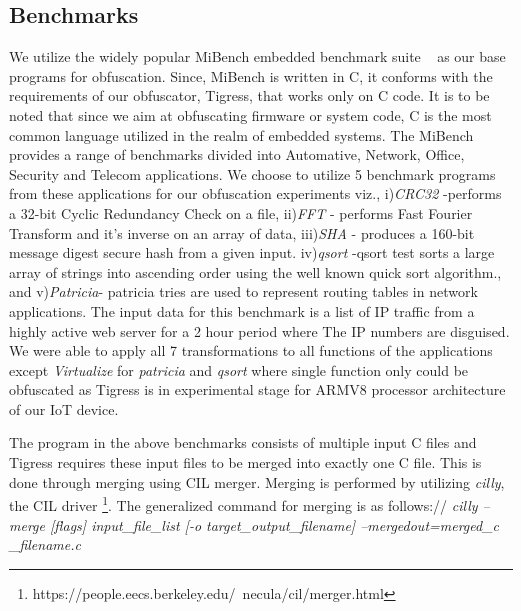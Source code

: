 \subsection{Benchmarks}

We utilize the widely popular MiBench embedded benchmark suite ~\cite{guthaus2001mibench} as our base programs for obfuscation. Since, MiBench is written in C, it conforms with the requirements of our obfuscator, Tigress, that works only on C code. It is to be noted that since we aim at obfuscating firmware or system code, C is the most common language utilized in the realm of embedded systems. The MiBench provides a range of benchmarks divided into Automative, Network, Office, Security and Telecom applications. We choose to utilize 5 benchmark programs from these applications for our obfuscation experiments viz., i)\textit{CRC32} -performs a 32-bit Cyclic Redundancy Check on a file, ii)\textit{FFT} - performs Fast Fourier Transform and it's inverse on an array of data, iii)\textit{SHA} - produces a 160-bit message digest secure hash from a given input. iv)\textit{qsort} -qsort test sorts a large array of strings into ascending order using the well known quick sort algorithm., and v)\textit{Patricia}- patricia tries are used to represent routing tables in network applications. The input data for this benchmark is a list of IP traffic from a highly active web server for a 2 hour period where The IP numbers are disguised.
We were able to apply all 7 transformations to all functions of the applications except \textit{Virtualize} for \textit{patricia} and \textit{qsort} where single function only could be obfuscated as Tigress is in experimental stage for ARMV8 processor architecture of our IoT device. 

The program in the above benchmarks consists of multiple input C files and Tigress requires these input files to be merged into exactly one C file. 
This is done through merging using CIL merger.
Merging is performed by utilizing \textit{cilly}, the CIL driver \footnote{https://people.eecs.berkeley.edu/~necula/cil/merger.html}. The generalized command for merging is as follows://
\textit{cilly --merge [flags] input\_file\_list [-o target\_output\_filename]
--mergedout=merged\_c \_filename.c}
